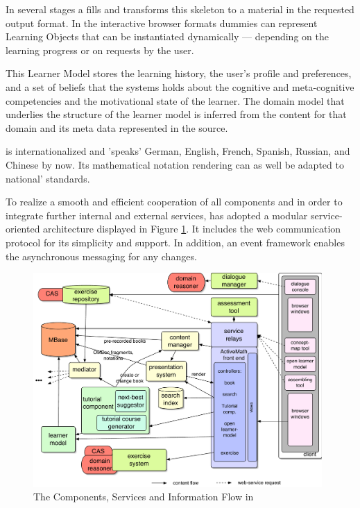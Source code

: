 In several stages a {} fills and transforms this skeleton
to a material in the requested output format. In the interactive browser formats dummies
can represent Learning Objects that can be instantiated dynamically ---
depending on the learning progress or on requests by the user.

This Learner Model stores the learning history, the user's profile and preferences, and a
set of beliefs that the systems holds about the cognitive and meta-cognitive competencies
and the motivational state of the learner. The domain model that underlies the structure
of the learner model is inferred from the content for that domain and its meta data
represented in the {\omdoc} source.
 
{\activemath} is internationalized and 'speaks' German, English, French, Spanish, Russian,
and Chinese by now. Its mathematical notation rendering can as well be adapted to
national' standards.
 
To realize a smooth and efficient cooperation of all components and in order to integrate
further internal and external services, {\activemath} has adopted a modular
service-oriented architecture displayed in Figure \ref{fig:LeAMarch}. It includes the
{\xmlrpc} web communication protocol for its simplicity and support. In addition, an event
framework enables the asynchronous messaging for any changes.

\begin{figure}[htp]
\begin{center}
  \includegraphics[width=11cm]{projects/activemath/diagrams/LeAMarchitecture}
  \caption{The Components, Services and Information Flow in {\activemath}}
  \label{fig:LeAMarch}
\end{center}
\end{figure} 

